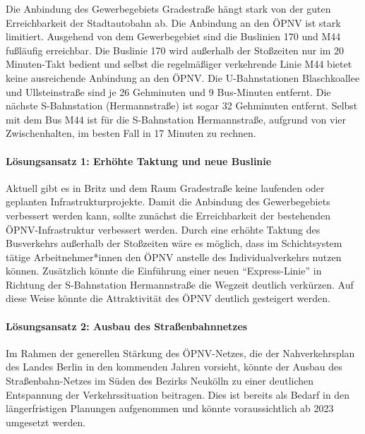 Die Anbindung des Gewerbegebiets Gradestraße hängt stark von der guten Erreichbarkeit der Stadtautobahn ab. Die Anbindung an den ÖPNV ist stark limitiert. Ausgehend von dem Gewerbegebiet sind die Buslinien 170 und M44 fußläufig erreichbar. Die Buslinie 170 wird außerhalb der Stoßzeiten nur im 20 Minuten-Takt bedient und selbst die regelmäßiger verkehrende Linie M44 bietet keine ausreichende Anbindung an den ÖPNV. Die U-Bahnstationen Blaschkoallee und Ullsteinstraße sind je 26 Gehminuten und 9 Bus-Minuten entfernt. Die nächste S-Bahnstation (Hermannstraße) ist sogar 32 Gehminuten entfernt. Selbst mit dem Bus M44 ist für die S-Bahnstation Hermannstraße, aufgrund von vier Zwischenhalten, im besten Fall in 17 Minuten zu rechnen.

\paragraph{Lösungsansatz 1: Erhöhte Taktung und neue Buslinie}
Aktuell gibt es in Britz und dem Raum Gradestraße keine laufenden oder geplanten Infrastrukturprojekte. Damit die Anbindung des Gewerbegebiets verbessert werden kann, sollte zunächst die Erreichbarkeit der bestehenden ÖPNV-Infrastruktur verbessert werden. Durch eine erhöhte Taktung des Busverkehrs außerhalb der Stoßzeiten wäre es möglich, dass im Schichtsystem tätige Arbeitnehmer*innen den ÖPNV anstelle des Individualverkehrs nutzen können. Zusätzlich könnte die Einführung einer neuen “Express-Linie” in Richtung der S-Bahnstation Hermannstraße die Wegzeit deutlich verkürzen. Auf diese Weise könnte die Attraktivität des ÖPNV deutlich gesteigert werden.

\paragraph{Lösungsansatz 2: Ausbau des Straßenbahnnetzes}
Im Rahmen der generellen Stärkung des ÖPNV-Netzes, die der Nahverkehrsplan des Landes Berlin in den kommenden Jahren vorsieht, könnte der Ausbau des Straßenbahn-Netzes im Süden des Bezirks Neukölln zu einer deutlichen Entspannung der Verkehrssituation beitragen. Dies ist bereits als Bedarf in den längerfristigen Planungen aufgenommen und könnte voraussichtlich ab 2023 umgesetzt werden.
